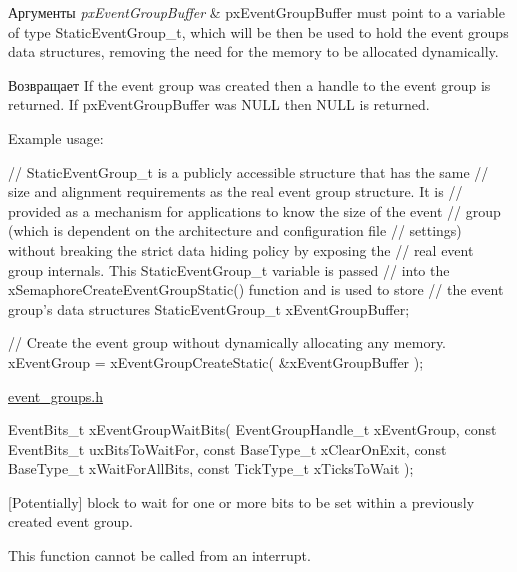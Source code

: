 \begin{DoxyParams}{Аргументы}
{\em px\+Event\+Group\+Buffer} & px\+Event\+Group\+Buffer must point to a variable of type Static\+Event\+Group\+\_\+t, which will be then be used to hold the event group\textquotesingle{}s data structures, removing the need for the memory to be allocated dynamically.\\
\hline
\end{DoxyParams}
\begin{DoxyReturn}{Возвращает}
If the event group was created then a handle to the event group is returned. If px\+Event\+Group\+Buffer was N\+U\+LL then N\+U\+LL is returned.
\end{DoxyReturn}
Example usage\+: 
\begin{DoxyPre}
   // StaticEventGroup\_t is a publicly accessible structure that has the same
   // size and alignment requirements as the real event group structure.  It is
   // provided as a mechanism for applications to know the size of the event
   // group (which is dependent on the architecture and configuration file
   // settings) without breaking the strict data hiding policy by exposing the
   // real event group internals.  This StaticEventGroup\_t variable is passed
   // into the xSemaphoreCreateEventGroupStatic() function and is used to store
   // the event group's data structures
   StaticEventGroup\_t xEventGroupBuffer;\end{DoxyPre}



\begin{DoxyPre}   // Create the event group without dynamically allocating any memory.
   xEventGroup = xEventGroupCreateStatic( \&xEventGroupBuffer );
  \end{DoxyPre}
 \mbox{\hyperlink{event__groups_8h}{event\+\_\+groups.\+h}} 
\begin{DoxyPre}
   EventBits\_t xEventGroupWaitBits(     EventGroupHandle\_t xEventGroup,
                                    const EventBits\_t uxBitsToWaitFor,
                                    const BaseType\_t xClearOnExit,
                                    const BaseType\_t xWaitForAllBits,
                                    const TickType\_t xTicksToWait );
\end{DoxyPre}


\mbox{[}Potentially\mbox{]} block to wait for one or more bits to be set within a previously created event group.

This function cannot be called from an interrupt.


